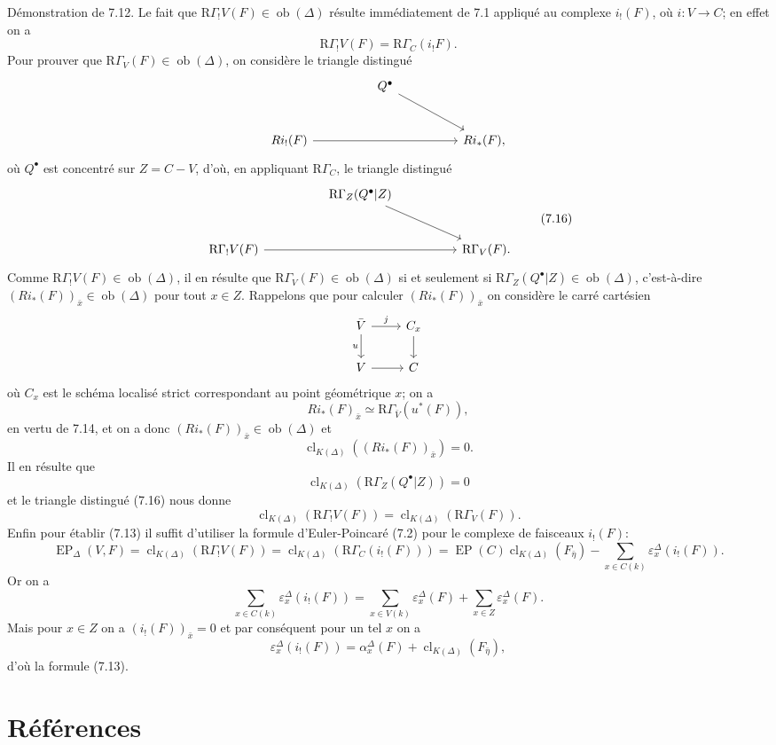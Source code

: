 \documentclass[11pt]{article}
\providecommand{\EP}{\operatorname{EP}}
\providecommand{\Ob}{\operatorname{ob}}
\providecommand{\Ob}{\operatorname{ob}}
\providecommand{\EP}{\operatorname{EP}}
\providecommand{\Ob}{\operatorname{Ob}}
\providecommand{\clK}[1]{\operatorname{cl}_{K(#1)}}
\providecommand{\RG}{\mathrm R\Gamma}
\begin{document}
Démonstration de 7.12. Le fait que $\RG_!V(F)\in\Ob(\Delta)$ résulte immédiatement de 7.1 appliqué au complexe $i_!(F)$, où $i:V\to C$; en effet on a
\[
\RG_!V(F)=\RG_C(i_!F).
\]
Pour prouver que $\RG_V(F)\in\Ob(\Delta)$, on considère le triangle distingué
\[
\begin{tikzcd}[column sep=huge,row sep=large]
& Q^\bullet \arrow[dr] &\\
Ri_!(F) \arrow[rr] && Ri_*(F),
\end{tikzcd}
\]
où $Q^\bullet$ est concentré sur $Z=C-V$, d'où, en appliquant $\RG_C$, le triangle distingué
\[
\begin{tikzcd}[column sep=huge,row sep=large]
& \RG_Z(Q^\bullet|Z) \arrow[dr] &\\
\RG_!V(F) \arrow[rr] && \RG_V(F).
\end{tikzcd}
\tag{7.16}
\]
Comme $\RG_!V(F)\in\Ob(\Delta)$, il en résulte que $\RG_V(F)\in\Ob(\Delta)$ si et seulement si $\RG_Z(Q^\bullet|Z)\in\Ob(\Delta)$, c'est-à-dire $(Ri_*(F))_{\bar x}\in\Ob(\Delta)$ pour tout $x\in Z$. Rappelons que pour calculer $(Ri_*(F))_{\bar x}$ on considère le carré cartésien
\[
\begin{tikzcd}
\bar V \arrow[r,"j"] \arrow[d,"u"'] & C_x \arrow[d]\\
V \arrow[r] & C
\end{tikzcd}
\]
où $C_x$ est le schéma localisé strict correspondant au point géométrique $x$; on a
\[
Ri_*(F)_{\bar x}\simeq \RG_{\bar V}(u^*(F)),
\]
en vertu de 7.14, et on a donc $(Ri_*(F))_{\bar x}\in\Ob(\Delta)$ et
\[
\clK{\Delta}((Ri_*(F))_{\bar x})=0.
\]
Il en résulte que
\[
\clK{\Delta}(\RG_Z(Q^\bullet|Z))=0
\]
et le triangle distingué (7.16) nous donne
\[
\clK{\Delta}(\RG_!V(F))=\clK{\Delta}(\RG_V(F)).
\]
Enfin pour établir (7.13) il suffit d'utiliser la formule d'Euler-Poincaré (7.2) pour le complexe de faisceaux $i_!(F)$:
\[
\EP_\Delta(V,F)
=
\clK{\Delta}(\RG_!V(F))
=
\clK{\Delta}(\RG_C(i_!(F)))
=
\EP(C)\clK{\Delta}(F_{\bar\eta})
-\sum_{x\in C(k)}\varepsilon_x^\Delta(i_!(F)).
\]
Or on a
\[
\sum_{x\in C(k)}\varepsilon_x^\Delta(i_!(F))
=
\sum_{x\in V(k)}\varepsilon_x^\Delta(F)
+\sum_{x\in Z}\varepsilon_x^\Delta(F).
\]
Mais pour $x\in Z$ on a $(i_!(F))_{\bar x}=0$ et par conséquent pour un tel $x$ on a
\[
\varepsilon_x^\Delta(i_!(F))
=
\alpha_x^\Delta(F)+\clK{\Delta}(F_{\bar\eta}),
\]
d'où la formule (7.13).

\section*{Références}
\end{document}
